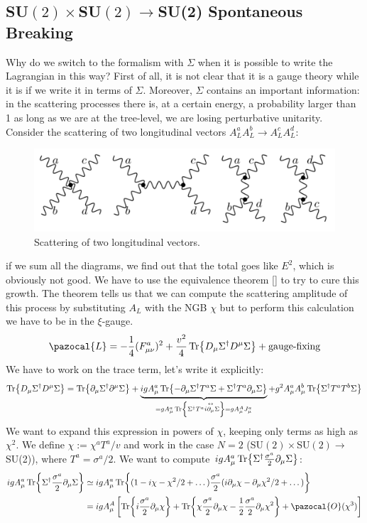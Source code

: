 \documentclass[../main.tex]{subfiles}
\begin{document}
\subsection{SU$(2)\times$SU$(2)\to$SU(2) Spontaneous Breaking}
Why do we switch to the formalism with $\Sigma$ when it is possible to write the Lagrangian in this way? First of all, it is not clear that it is a gauge theory while it is if we write it in terms of $\Sigma$. Moreover, $\Sigma$ contains an important information: in the scattering processes there is, at a certain energy, a probability larger than 1 as long as we are at the tree-level, we are losing perturbative unitarity. Consider the scattering of two longitudinal vectors $A_L^aA_L^b\to A_L^cA_L^d$: 
\begin{figure}[h]
    \centering
    \includegraphics{Images/abcd.pdf}
    \caption{Scattering of two longitudinal vectors.}
    \label{fig:my_label}
\end{figure}if we sum all the diagrams, we find out that the total goes like $E^2$, which is obviously not good. We have to use the equivalence theorem [] to try to cure this growth. The theorem tells us that we can compute the scattering amplitude of this process by substituting $A_L$ with the NGB $\chi$ but to perform this calculation we have to be in the $\xi$-gauge. 
\[
\pazocal{L}=-\frac{1}{4}(F_{\mu\nu}^a)^2+\frac{v^2}{4}\Tr{D_\mu\Sigma^\dagger D^\mu\Sigma}+\text{gauge-fixing}
\]
We have to work on the trace term, let's write it explicitly:
\[
\Tr{D_\mu\Sigma^\dagger D^\mu\Sigma}=\Tr{\partial_\mu\Sigma^\dagger\partial^\mu\Sigma}+\underbrace{igA_\mu^a\Tr{-\partial_\mu\Sigma^\dagger T^a\Sigma+\Sigma^\dagger T^a\partial_\mu\Sigma}}_{=gA_\mu^a\Tr{\Sigma^\dagger T^ai\overset{\leftrightarrow}{\partial_\mu}\Sigma}=gA_\mu^AJ_\mu^a}+g^2A_\mu^aA_\mu^b\Tr{\Sigma^\dagger T^aT^b\Sigma}
\]
We want to expand this expression in powers of $\chi$, keeping only terms as high as $\chi^2$. We define $\chi:=\chi^aT^a/v$ and work in the case $N=2$ (SU$(2)\times$SU$(2)\to$SU(2)), where $T^a=\sigma^a/2$. We want to compute $igA_\mu^a\Tr{\Sigma^\dagger\frac{\sigma^a}{2}\partial_\mu\Sigma}$:
\begin{align*}
igA_\mu^a\Tr{\Sigma^\dagger\frac{\sigma^a}{2}\partial_\mu\Sigma}&\simeq igA_\mu^a\Tr{(1-i\chi-\chi^2/2+\dots)\frac{\sigma^a}{2}(i\partial_\mu\chi-\partial_\mu\chi^2/2+\dots)}\\
&=igA_\mu^A\left[\Tr{i\frac{\sigma^a}{2}\partial_\mu\chi}+\Tr{\chi\frac{\sigma^a}{2}\partial_\mu\chi-\frac{1}{2}\frac{\sigma^a}{2}\partial_\mu\chi^2}+\pazocal{O}(\chi^3)\right]
\end{align*}
\end{document}
